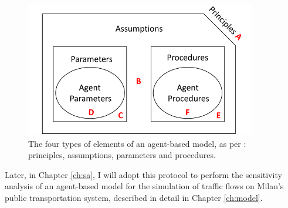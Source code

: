 \begin{figure}[H]
    \centering
    \includegraphics[width = 0.9\textwidth]{tex/pics/borgonovo_elements.png}
    \caption{The four types of elements of an agent-based model, as per \textcite{Borgonovo2022SensitivityAO}: principles, assumptions, parameters and procedures.}
    \label{fig:borgonovo_elements}
\end{figure}


Later, in Chapter \ref{ch:sa}, I will adopt this protocol to perform the sensitivity analysis of an agent-based model for the simulation of traffic flows on Milan's public transportation system, described in detail in Chapter \ref{ch:model}.